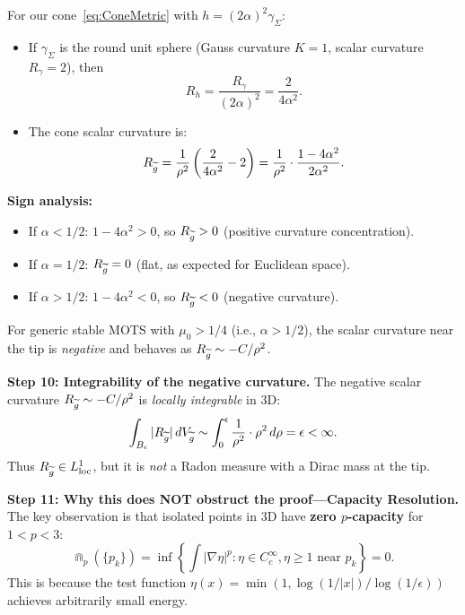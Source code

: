 \begin{lemma}
For our cone~\eqref{eq:ConeMetric} with $h = (2\alpha)^2 \gamma_\Sigma$:
\begin{itemize}
    \item If $\gamma_\Sigma$ is the round unit sphere (Gauss curvature $K = 1$, scalar curvature $R_{\gamma} = 2$), then
    \begin{equation}
        R_h = \frac{R_\gamma}{(2\alpha)^2} = \frac{2}{4\alpha^2}.
    \end{equation}
    \item The cone scalar curvature is:
    \begin{equation}
        R_{\widetilde{g}} = \frac{1}{\rho^2}\left(\frac{2}{4\alpha^2} - 2\right) = \frac{1}{\rho^2} \cdot \frac{1 - 4\alpha^2}{2\alpha^2}.
    \end{equation}
\end{itemize}

\textbf{Sign analysis:}
\begin{itemize}
    \item If $\alpha < 1/2$: $1 - 4\alpha^2 > 0$, so $R_{\widetilde{g}} > 0$ (positive curvature concentration).
    \item If $\alpha = 1/2$: $R_{\widetilde{g}} = 0$ (flat, as expected for Euclidean space).
    \item If $\alpha > 1/2$: $1 - 4\alpha^2 < 0$, so $R_{\widetilde{g}} < 0$ (negative curvature).
\end{itemize}

For generic stable MOTS with $\mu_0 > 1/4$ (i.e., $\alpha > 1/2$), the scalar curvature near the tip is \emph{negative} and behaves as $R_{\widetilde{g}} \sim -C/\rho^2$.

\textbf{Step 10: Integrability of the negative curvature.}
The negative scalar curvature $R_{\widetilde{g}} \sim -C/\rho^2$ is \emph{locally integrable} in 3D:
\begin{equation}
    \int_{B_\epsilon} |R_{\widetilde{g}}| \, dV_{\widetilde{g}} \sim \int_0^\epsilon \frac{1}{\rho^2} \cdot \rho^2 \, d\rho = \epsilon < \infty.
\end{equation}
Thus $R_{\widetilde{g}} \in L^1_{\text{loc}}$, but it is \emph{not} a Radon measure with a Dirac mass at the tip.

\textbf{Step 11: Why this does NOT obstruct the proof---Capacity Resolution.}
The key observation is that isolated points in 3D have \textbf{zero $p$-capacity} for $1 < p < 3$:
\begin{equation}
    \Cap_p(\{p_k\}) = \inf\left\{\int |\nabla \eta|^p : \eta \in C^\infty_c, \eta \ge 1 \text{ near } p_k\right\} = 0.
\end{equation}
This is because the test function $\eta(x) = \min(1, \log(1/|x|)/\log(1/\epsilon))$ achieves arbitrarily small energy.


\end{lemma}
